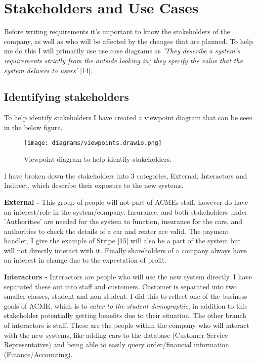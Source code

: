 \section{Stakeholders and Use Cases}
  Before writing requirements it's important to know the stakeholders of the company, as well as who will be affected by the changes that are planned.
  To help me do this I will primarily use use case diagrams as \textit{'They describe a system's requirements strictly from the outside looking in;
  they specify the value that the system delivers to users'} [14].

  \subsection{Identifying stakeholders}
    To help identify stakeholders I have created a viewpoint diagram that can be seen in the below figure.
    \begin{figure}[H]
      \centering
      \texttt{[image: diagrams/viewpoints.drawio.png]}
      \caption{Viewpoint diagram to help identify stakeholders.}
      \label{fig:viewpoint}
    \end{figure}

    I have broken down the stakeholders into 3 categories, External, Interactors and Indirect, which describe their
    exposure to the new systems.

    \vspace{0.2cm}

    \noindent\textbf{External -} This group of people will not part of ACMEs staff, however do have an interest/role in the system/company. Insurance, 
    and both stakeholders under 'Authorities' are needed for the system to function, insurance for the cars, and authorities to
    check the details of a car and renter are valid. The payment handler, I give the example of Stripe [15] will also be a part of the system
    but will not directly interact with it. Finally shareholders of a company always have an interest in change due to the expectation of profit.

    \vspace{0.2cm}

    \noindent\textbf{Interactors -} Interactors are people who will use the new system directly. I have separated these out into staff and customers.
    Customer is separated into two smaller classes, student and non-student. I did this to reflect one of the business goals of ACME, which is to \textit{
    cater to the student demographic}, in addition to this stakeholder potentially getting benefits due to their situation. The other branch of interactors
    is staff. These are the people within the company who will interact with the new systems, like adding cars to the database (Customer Service Representative)
    and being able to easily query order/financial information (Finance/Accounting).

